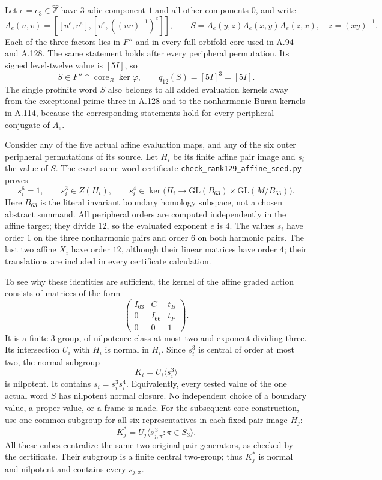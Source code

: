 Let $e=e_3\in\widehat{\mathbb Z}$ have $3$-adic component
$1$ and all other components $0$, and write
\[
 A_e(u,v)=[[u^e,v^e],[v^e,((uv)^{-1})^e]],
 \qquad
 S=A_e(y,z)A_e(x,y)A_e(z,x),\quad z=(xy)^{-1}.
\]
Each of the three factors lies in $F''$ and in every full
orbifold core used in A.94 and A.128.  The same statement
holds after every peripheral permutation.  Its signed
level-twelve value is $[5I]$, so
\[
 S\in F''\cap\operatorname{core}_B\ker\varphi,
 \qquad q_{12}(S)=[5I]^3=[5I].
\]
The single profinite word $S$ also belongs to all added
evaluation kernels away from the exceptional prime three
in A.128 and to the nonharmonic Burau kernels in A.114,
because the corresponding statements hold for every
peripheral conjugate of $A_e$.

Consider any of the five actual affine evaluation maps,
and any of the six outer peripheral permutations of its
source.  Let $H_i$ be its finite affine pair image and
$s_i$ the value of $S$.  The exact same-word certificate
\texttt{check\_rank129\_affine\_seed.py} proves
\[
 s_i^6=1,\qquad s_i^3\in Z(H_i),\qquad
 s_i^4\in\ker\bigl(H_i\longrightarrow
       \mathrm{GL}(B_{63})\times\mathrm{GL}(M/B_{63})\bigr).
\]
Here $B_{63}$ is the literal invariant boundary homology
subspace, not a chosen abstract summand.  All peripheral
orders are computed independently in the affine target;
they divide $12$, so the evaluated exponent $e$ is $4$.
The values $s_i$ have order $1$ on the three nonharmonic
pairs and order $6$ on both harmonic pairs.  The last two
affine $X_i$ have order $12$, although their linear
matrices have order $4$; their translations are included
in every certificate calculation.

To see why these identities are sufficient, the kernel
of the affine graded action consists of matrices of the
form
\[
 \begin{pmatrix}
  I_{63}&C&t_B\\
  0&I_{66}&t_P\\
  0&0&1
 \end{pmatrix}.
\]
It is a finite $3$-group, of nilpotence class at most two
and exponent dividing three.  Its intersection $U_i$
with $H_i$ is normal in $H_i$.  Since $s_i^3$ is central
of order at most two, the normal subgroup
\[
             K_i=U_i\langle s_i^3\rangle
\]
is nilpotent.  It contains $s_i=s_i^3s_i^4$.
Equivalently, every tested value of the one actual word
$S$ has nilpotent normal closure.  No independent choice
of a boundary value, a proper value, or a frame is made.
For the subsequent core construction, use one common subgroup
for all six representatives in each fixed pair image $H_j$:
\[
 K_j^*=U_j\bigl\langle s_{j,\pi}^{\,3}:
                       \pi\in S_3\bigr\rangle.
\]
All these cubes centralize the same two original pair
generators, as checked by the certificate.  Their subgroup
is a finite central two-group; thus $K_j^*$ is normal and
nilpotent and contains every $s_{j,\pi}$.

